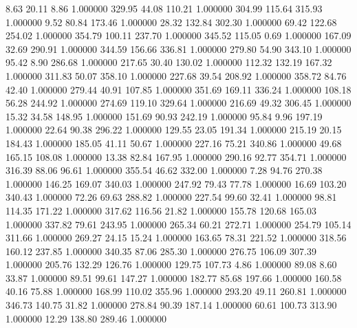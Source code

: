       8.63     20.11      8.86  1.000000
    329.95     44.08    110.21  1.000000
    304.99    115.64    315.93  1.000000
      9.52     80.84    173.46  1.000000
     28.32    132.84    302.30  1.000000
     69.42    122.68    254.02  1.000000
    354.79    100.11    237.70  1.000000
    345.52    115.05      0.69  1.000000
    167.09     32.69    290.91  1.000000
    344.59    156.66    336.81  1.000000
    279.80     54.90    343.10  1.000000
     95.42      8.90    286.68  1.000000
    217.65     30.40    130.02  1.000000
    112.32    132.19    167.32  1.000000
    311.83     50.07    358.10  1.000000
    227.68     39.54    208.92  1.000000
    358.72     84.76     42.40  1.000000
    279.44     40.91    107.85  1.000000
    351.69    169.11    336.24  1.000000
    108.18     56.28    244.92  1.000000
    274.69    119.10    329.64  1.000000
    216.69     49.32    306.45  1.000000
     15.32     34.58    148.95  1.000000
    151.69     90.93    242.19  1.000000
     95.84      9.96    197.19  1.000000
     22.64     90.38    296.22  1.000000
    129.55     23.05    191.34  1.000000
    215.19     20.15    184.43  1.000000
    185.05     41.11     50.67  1.000000
    227.16     75.21    340.86  1.000000
     49.68    165.15    108.08  1.000000
     13.38     82.84    167.95  1.000000
    290.16     92.77    354.71  1.000000
    316.39     88.06     96.61  1.000000
    355.54     46.62    332.00  1.000000
      7.28     94.76    270.38  1.000000
    146.25    169.07    340.03  1.000000
    247.92     79.43     77.78  1.000000
     16.69    103.20    340.43  1.000000
     72.26     69.63    288.82  1.000000
    227.54     99.60     32.41  1.000000
     98.81    114.35    171.22  1.000000
    317.62    116.56     21.82  1.000000
    155.78    120.68    165.03  1.000000
    337.82     79.61    243.95  1.000000
    265.34     60.21    272.71  1.000000
    254.79    105.14    311.66  1.000000
    269.27     24.15     15.24  1.000000
    163.65     78.31    221.52  1.000000
    318.56    160.12    237.85  1.000000
    340.35     87.06    285.30  1.000000
    276.75    106.09    307.39  1.000000
    205.76    132.29    126.76  1.000000
    129.75    107.73      4.86  1.000000
     89.08      8.60     33.87  1.000000
     89.51     99.61    147.27  1.000000
    182.77     85.68    197.66  1.000000
    160.58     40.16     75.88  1.000000
    168.99    110.02    355.96  1.000000
    293.20     49.11    260.81  1.000000
    346.73    140.75     31.82  1.000000
    278.84     90.39    187.14  1.000000
     60.61    100.73    313.90  1.000000
     12.29    138.80    289.46  1.000000
